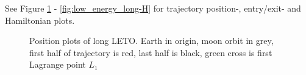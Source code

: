 See Figure \ref{fig:low_energy_long-position} - \ref{fig:low_energy_long-H} for trajectory position-, entry/exit- and Hamiltonian plots.

\begin{figure}[ht!]
    \centering
        \caption{Position plots of long LETO. Earth in origin, moon orbit in grey, first half of trajectory is red, last half is black, green cross is first Lagrange point $L_1$}
        \label{fig:low_energy_long-position}
\end{figure}

